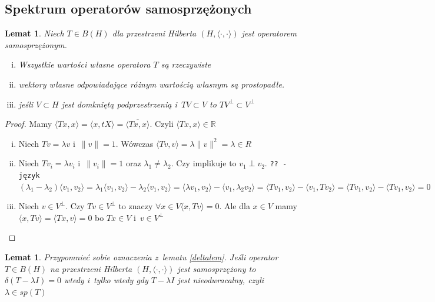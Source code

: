 \documentclass[11pt]{mwrep}
\renewcommand{\[}{\begin{equation}}
\renewcommand{\]}{\end{equation}}
\newcommand{\R}{{\ensuremath{\mathbb R}}}
\newcommand{\scal}{\langle \cdot,\cdot \rangle}
\newtheorem{lem}[subsection]{Lemat}
\newcounter{numer}
\begin{document}
\subsection{Spektrum operatorów samosprzężonych}
\begin{lem}
	Niech $T\in B(H)$ dla przestrzeni Hilberta  $(H,\scal)$ jest operatorem samosprzężonym.
	\begin{enumerate}[(i)]
		\item Wszystkie wartości własne operatora $T$ są rzeczywiste
		\item wektory własne odpowiadające różnym wartością własnym są prostopadłe.
		\item jeśli $V\subset H$ jest domkniętą podprzestrzenią  i~$TV \subset V$ to $TV^\perp \subset V^\perp$
	\end{enumerate}
\end{lem}
\begin{proof}
	Mamy $\langle Tx,x \rangle = \langle x,tX \rangle = \overline{\langle Tx,x \rangle}$. Czyli $\langle Tx,x \rangle\in \R$
	\begin{enumerate}[(i)]
		\item Niech $Tv = \lambda v$ i~$\|v\|=1$. Wówczas $\langle Tv,v \rangle = \lambda \|v\|^2=\lambda\in R$ 
		\item Niech $Tv_i = \lambda v_i$ i~$\|v_i\|=1$ oraz $\lambda_1 \not = \lambda_2$. Czy implikuje to $v_1 \perp v_2 $. \texttt{?? - język}\\
			$(\lambda_1-\lambda_2)\langle v_1,v_2 \rangle = \lambda_1 \langle v_1, v_2 \rangle - \lambda_2\langle v_1,v_2 \rangle=
			\langle \lambda v_1, v_2  \rangle - \langle v_1, \lambda_2 v_2  \rangle = \langle T v_1, v_2  \rangle - \langle v_1, T v_2 \rangle 
			=\langle T v_1,v_2 \rangle - \langle T v_1, v_2 \rangle =0$
		\item Niech $v \in V^\perp$. Czy $Tv \in V^\perp$ to znaczy $\forall x \in V \langle x, Tv  \rangle=0$. 
			Ale dla $x \in V$ mamy $\langle x,Tv \rangle = \langle T x, v \rangle=0$ bo $Tx \in V$ i~$v \in V^\perp$
	\end{enumerate}
\end{proof}
\begin{lem}
 	Przypomnieć sobie oznaczenia z~lematu \ref{deltalem}.
	Jeśli operator $T\in B(H)$  na przestrzeni Hilberta $(H,\scal)$ jest samosprzężony to
	$\delta(T-\lambda I) = 0$ wtedy i~tylko wtedy gdy $T-\lambda I$ jest nieodwracalny, czyli $\lambda \in sp(T)$ 
\end{lem}
\end{document}

